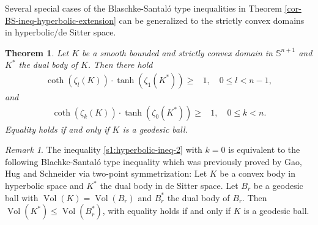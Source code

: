 \documentclass[11pt,reqno]{amsart}
\newtheorem{thm}{Theorem}[section]
\theoremstyle{definition}
\theoremstyle{remark}
\newtheorem{rem}{Remark}
\numberwithin{equation}{section}
\renewcommand{\(}{\left(}
\renewcommand{\)}{\right)}
\renewcommand{\~}{\tilde}
\renewcommand{\-}{\overline}
\newcommand{\Vol}{\operatorname{Vol}}
\begin{document}
Several special cases of the Blaschke-Santal\'o type inequalities in Theorem \ref{cor-BS-ineq-hyperbolic-extension} can be generalized to the strictly convex domains in hyperbolic/de Sitter space.
\begin{thm}\label{cor-BS-ineq-hyperbolic-extension-II}
	Let $K$ be a smooth bounded and strictly convex domain in $\mathbb S^{n+1}$ and $K^\ast$ the dual body of $K$. Then there hold
	\begin{align}
	\coth(\zeta_{l}(K)) \cdot \tanh(\zeta_1(K^\ast)) \geq &1,  \quad 0\leq l<n-1,  \label{s1:hyperbolic-ineq-1}
	\end{align}
	and
	\begin{align}
	\coth(\zeta_{k}(K)) \cdot \tanh(\zeta_0(K^\ast)) \geq &1,  \quad 0\leq k<n.  \label{s1:hyperbolic-ineq-2}
	\end{align}
	Equality holds if and only if $K$ is a geodesic ball.
\end{thm}
\begin{rem}
	The inequality \eqref{s1:hyperbolic-ineq-2} with $k=0$ is equivalent to the following Blachke-Santal\'o type inequality which was previously proved by Gao, Hug and Schneider \cite{GHS03} via two-point symmetrization: Let $K$ be a convex body in hyperbolic space and $K^\ast$ the dual body in de Sitter space. Let $B_r$ be a geodesic ball with $\Vol(K)=\Vol(B_r)$ and $B_r^\ast$ the dual body of $B_r$. Then $\Vol(K^\ast)\leq \Vol(B_r^\ast)$, with equality holds if and only if $K$ is a geodesic ball.
\end{rem}
\end{document}

